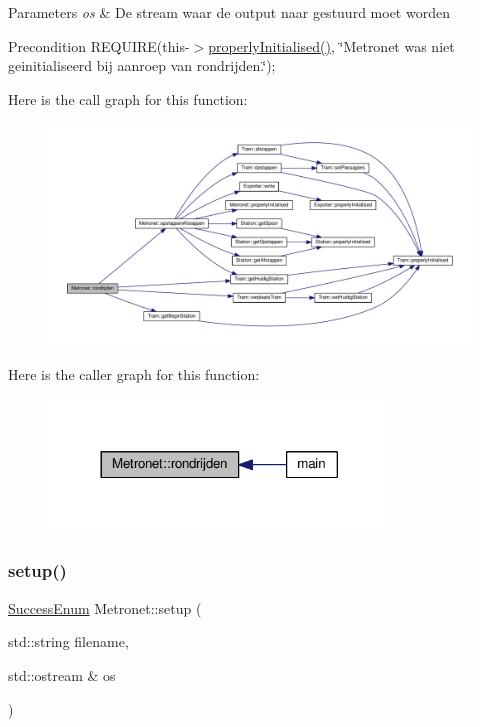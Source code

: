 \begin{DoxyParams}{Parameters}
{\em os} & De stream waar de output naar gestuurd moet worden \\
\hline
\end{DoxyParams}
\begin{DoxyPrecond}{Precondition}
R\+E\+Q\+U\+I\+RE(this-\/$>$\hyperlink{class_metronet_a3d2adce29a947f162924279b766de645}{properly\+Initialised()}, \char`\"{}\+Metronet was niet geinitialiseerd bij aanroep van rondrijden.\char`\"{}); 
\end{DoxyPrecond}
Here is the call graph for this function\+:\nopagebreak
\begin{figure}[H]
\begin{center}
\leavevmode
\includegraphics[width=350pt]{class_metronet_a180b666c7d4cc52f873579ab7f95ea35_cgraph}
\end{center}
\end{figure}
Here is the caller graph for this function\+:\nopagebreak
\begin{figure}[H]
\begin{center}
\leavevmode
\includegraphics[width=257pt]{class_metronet_a180b666c7d4cc52f873579ab7f95ea35_icgraph}
\end{center}
\end{figure}
\mbox{\label{class_metronet_ad12d6e52c7f5c23d23e87992b4abc1fa}} 
\subsubsection{\texorpdfstring{setup()}{setup()}}
{\footnotesize\ttfamily \hyperlink{_metronet_8h_ae69e1bf070c1c339170236b3fef70a4d}{Success\+Enum} Metronet\+::setup (\begin{DoxyParamCaption}\item[{std\+::string}]{filename,  }\item[{std\+::ostream \&}]{os }\end{DoxyParamCaption})}



